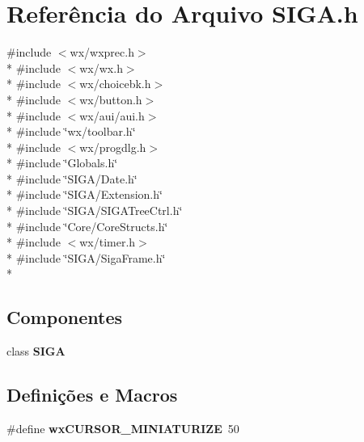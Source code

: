 \section{Referência do Arquivo S\+I\+G\+A.\+h}
\label{_s_i_g_a_8h}
{\ttfamily \#include $<$wx/wxprec.\+h$>$}\\*
{\ttfamily \#include $<$wx/wx.\+h$>$}\\*
{\ttfamily \#include $<$wx/choicebk.\+h$>$}\\*
{\ttfamily \#include $<$wx/button.\+h$>$}\\*
{\ttfamily \#include $<$wx/aui/aui.\+h$>$}\\*
{\ttfamily \#include \char`\"{}wx/toolbar.\+h\char`\"{}}\\*
{\ttfamily \#include $<$wx/progdlg.\+h$>$}\\*
{\ttfamily \#include \char`\"{}Globals.\+h\char`\"{}}\\*
{\ttfamily \#include \char`\"{}S\+I\+G\+A/\+Date.\+h\char`\"{}}\\*
{\ttfamily \#include \char`\"{}S\+I\+G\+A/\+Extension.\+h\char`\"{}}\\*
{\ttfamily \#include \char`\"{}S\+I\+G\+A/\+S\+I\+G\+A\+Tree\+Ctrl.\+h\char`\"{}}\\*
{\ttfamily \#include \char`\"{}Core/\+Core\+Structs.\+h\char`\"{}}\\*
{\ttfamily \#include $<$wx/timer.\+h$>$}\\*
{\ttfamily \#include \char`\"{}S\+I\+G\+A/\+Siga\+Frame.\+h\char`\"{}}\\*
\subsection*{Componentes}
\begin{DoxyCompactItemize}
\item 
class {\bf S\+I\+GA}
\end{DoxyCompactItemize}
\subsection*{Definições e Macros}
\begin{DoxyCompactItemize}
\item 
\#define {\bf wx\+C\+U\+R\+S\+O\+R\+\_\+\+M\+I\+N\+I\+A\+T\+U\+R\+I\+ZE}~50
\end{DoxyCompactItemize}
